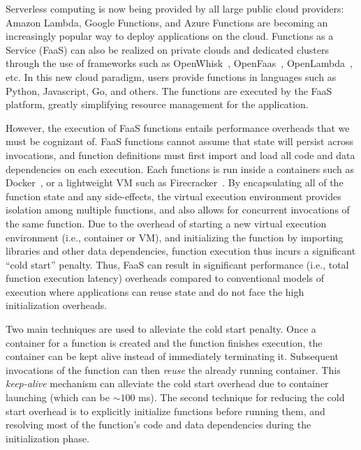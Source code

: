 
Serverless computing is now being provided by all large public cloud providers: Amazon Lambda, Google Functions, and Azure Functions are becoming an increasingly popular way to deploy applications on the cloud.  
Functions as a Service (FaaS) can also be realized on private clouds and dedicated clusters through the use of frameworks such as OpenWhisk~\cite{openwhisk}, OpenFaas~\cite{openfaas}, OpenLambda~\cite{hendrickson2016serverless}, etc. 
%
In this new cloud paradigm, users provide functions in languages such as Python, Javascript, Go, and others. 
%
The functions are executed by the FaaS platform, greatly simplifying resource management for the application. 





However, the execution of FaaS functions entails performance overheads that we must be cognizant of. 
%
%
FaaS functions cannot assume that state will persist across invocations, and function definitions must first import and load all code and data dependencies on each execution. 
%
Each functions is run inside a containers such as Docker~\cite{docker-main}, or a lightweight VM such as Firecracker~\cite{firecracker-nsdi20}. 
By encapsulating all of the function state and any side-effects, the virtual execution environment provides isolation among multiple functions, and also allows for concurrent invocations of the same function. 
%
Due to the overhead of starting a new virtual execution environment (i.e., container or VM), and initializing the function by importing libraries and other data dependencies, function execution thus incurs a significant ``cold start'' penalty. 
%
Thus, FaaS can result in significant performance (i.e., total function execution latency) overheads compared to conventional models of execution where applications can reuse state and do not face the high initialization overheads. 


Two main techniques are used to alleviate the cold start penalty. 
Once a container for a function is created and the function finishes execution, the container can be kept alive instead of immediately terminating it. 
Subsequent invocations of the function can then \emph{reuse} the already running container.
This \emph{keep-alive} mechanism can alleviate the cold start overhead due to container launching (which can be $\sim 100$ ms). %
The second technique for reducing the cold start overhead is to explicitly initialize functions before running them, and resolving most of the function's code and data dependencies during the initialization phase. 

